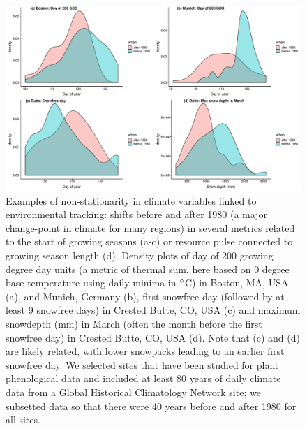 \documentclass[11pt,letterpaper]{article}
\begin{document}
\begin{figure}[h!]
\centering
\includegraphics[width=1\textwidth]{..//..//..//R/graphs/otherdat/climdata.pdf}
\caption{Examples of non-stationarity in climate variables linked to environmental tracking: shifts before and after 1980 (a major change-point in climate for many regions) in several metrics related to the start of growing seasons (a-c) or resource pulse connected to growing season length (d). Density plots of day of 200 growing degree day units (a metric of thermal sum, here based on 0 degree base temperature using daily minima in $\degree$C) in Boston, MA, USA (a), and Munich, Germany (b), first snowfree day (followed by at least 9 snowfree days) in Crested Butte, CO, USA (c) and maximum snowdepth (mm) in March (often the month before the first snowfree day) in Crested Butte, CO, USA (d). Note that (c) and (d) are likely related, with lower snowpacks leading to an earlier first snowfree day. We selected sites that have been studied for plant phenological data and included at least 80 years of daily climate data from a Global Historical Climatology Network site; we subsetted data so that there were 40 years before and after 1980 for all sites.} %
 \label{fig:climdat}
\end{figure}
\end{document}
